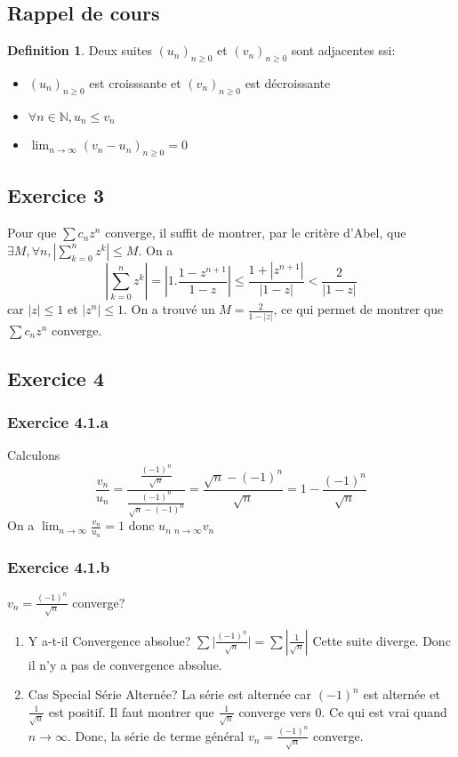 \documentclass[]{book}
\theoremstyle{definition}
\newtheorem{defn}{Definition}
\newcommand{\bb}[1]{\mathbb{#1}}
\newcommand{\N}{\bb{N}}
\begin{document}
\subsection*{Rappel de cours}
\begin{defn}
Deux suites $(u_n)_{n\geq0}$ et $(v_n)_{n\geq0}$ sont adjacentes ssi:
\begin{itemize}
\item $(u_n)_{n\geq0}$ est croisssante et $(v_n)_{n\geq0}$ est d\'ecroissante
\item $\forall n \in \N, u_n \leq v_n$
\item $\lim_{n \to \infty}(v_n-u_n)_{n\geq0} = 0$
\end{itemize}  
\end{defn}


\newpage
\subsection*{Exercice 3}
Pour que $\sum{c_nz^n}$ converge, il suffit de montrer, par le crit\`ere d'Abel, que $\exists M, \forall n, |\sum_{k=0}^{n}{z^k}| \leq M$. 
On a 
$$|\sum_{k=0}^{n}{z^k}| = \left|1.\frac{1-z^{n+1}}{1-z}\right| \leq \frac{1 + |z^{n+1}|}{|1-z|} < \frac{2}{|1-z|} $$
car $|z| \leq 1$ et $|z^{n}| \leq 1$. On a trouv\'e un $M = \frac{2}{1-|z|}$, ce qui permet de montrer que $\sum{c_nz^n}$ converge. 


\subsection*{Exercice 4}
\subsubsection*{Exercice 4.1.a}
Calculons
$$
\frac{v_n}{u_n} = \frac{\frac{(-1)^n}{\sqrt{n}}}{\frac{(-1)^n}{\sqrt{n}-(-1)^n}} = \frac{\sqrt{n}-(-1)^n}{\sqrt{n}} = 1 - \frac{(-1)^n}{\sqrt{n}}
$$
On a $\lim_{n \to \infty} \frac{v_n}{u_n} = 1$ donc $u_n ~_{n\to \infty} v_n$ 

\subsubsection*{Exercice 4.1.b}
$v_n = \frac{(-1)^n}{\sqrt{n}}$ converge? \\

\begin{enumerate}
\item Y a-t-il Convergence absolue? $\sum{|\frac{(-1)^n}{\sqrt{n}}}| = \sum{\left|\frac{1}{\sqrt{n}}\right|}$ Cette suite diverge. Donc il n'y a pas de convergence absolue.
\item Cas Special S\'erie Altern\'ee? La s\'erie est altern\'ee car $(-1)^n$ est altern\'ee et $\frac{1}{\sqrt{n}}$ est positif. Il faut montrer que $\frac{1}{\sqrt{n}}$ converge vers 0. Ce qui est vrai quand $n \to \infty$. Donc, la s\'erie de terme g\'en\'eral $v_n = \frac{(-1)^n}{\sqrt{n}}$ converge.
\end{enumerate} 
\end{document}

